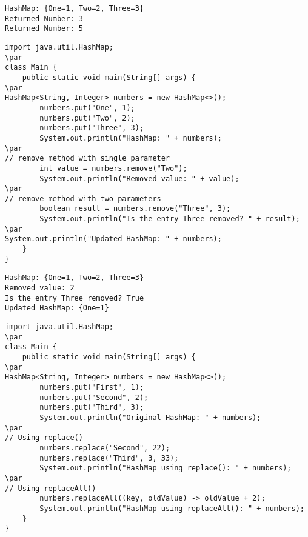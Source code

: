 \documentclass{book}
\def\lthtmlcheckvsize{\ifdim\ht\sizebox<\vsize 
  \ifdim\wd\sizebox<\hsize\expandafter\hfill\fi \expandafter\vfill
  \else\expandafter\vss\fi}%
\begin{document}
{\newpage\clearpage
{}%
\begin{lstlisting}
HashMap: {One=1, Two=2, Three=3}
Returned Number: 3
Returned Number: 5
\end{lstlisting}%
\lthtmlfigureZ
\lthtmlcheckvsize\clearpage}

{\newpage\clearpage
{}%
\begin{lstlisting}
import java.util.HashMap;
\par
class Main {
    public static void main(String[] args) {
\par
HashMap<String, Integer> numbers = new HashMap<>();
        numbers.put("One", 1);
        numbers.put("Two", 2);
        numbers.put("Three", 3);
        System.out.println("HashMap: " + numbers);
\par
// remove method with single parameter
        int value = numbers.remove("Two");
        System.out.println("Removed value: " + value);
\par
// remove method with two parameters
        boolean result = numbers.remove("Three", 3);
        System.out.println("Is the entry Three removed? " + result);
\par
System.out.println("Updated HashMap: " + numbers);
    }
}
\end{lstlisting}%
\lthtmlfigureZ
\lthtmlcheckvsize\clearpage}

{\newpage\clearpage
{}%
\begin{lstlisting}
HashMap: {One=1, Two=2, Three=3}
Removed value: 2
Is the entry Three removed? True
Updated HashMap: {One=1}
\end{lstlisting}%
\lthtmlfigureZ
\lthtmlcheckvsize\clearpage}

{\newpage\clearpage
{}%
\begin{lstlisting}
import java.util.HashMap;
\par
class Main {
    public static void main(String[] args) {
\par
HashMap<String, Integer> numbers = new HashMap<>();
        numbers.put("First", 1);
        numbers.put("Second", 2);
        numbers.put("Third", 3);
        System.out.println("Original HashMap: " + numbers);
\par
// Using replace()
        numbers.replace("Second", 22);
        numbers.replace("Third", 3, 33);
        System.out.println("HashMap using replace(): " + numbers);
\par
// Using replaceAll()
        numbers.replaceAll((key, oldValue) -> oldValue + 2);
        System.out.println("HashMap using replaceAll(): " + numbers);
    }
}
\end{lstlisting}%
\lthtmlfigureZ
\lthtmlcheckvsize\clearpage}
\end{document}
